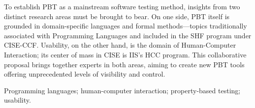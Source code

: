 

To establish PBT as a mainstream software
testing method, insights from two distinct research areas must be
brought to bear.
On one side, PBT itself is grounded in domain-specific languages and
formal methods---topics traditionally associated with Programming
Languages and included in the SHF
program under CISE-CCF.  Usability, on the other hand, is the domain
of Human-Computer Interaction; its center of mass in CISE is IIS's
HCC program.  This collaborative proposal brings together
experts in both areas, aiming to create new PBT tools
offering unprecedented levels of visibility and control.

\smallskip

 Programming languages; human-computer
interaction; property-based testing; usability.

